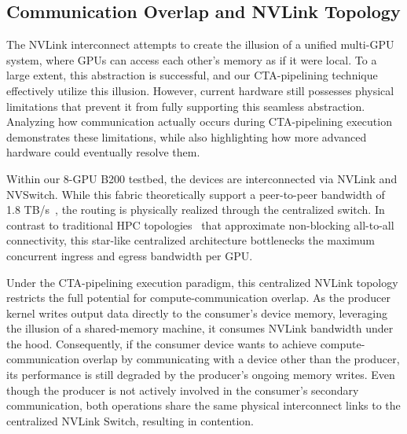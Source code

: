 

\subsection{Communication Overlap and NVLink Topology}

The NVLink interconnect attempts to create the illusion of a unified multi-GPU system, where GPUs can access each other's memory as if it were local. To a large extent, this abstraction is successful, and our CTA-pipelining technique effectively utilize this illusion. However, current hardware still possesses physical limitations that prevent it from fully supporting this seamless abstraction. Analyzing how communication actually occurs during CTA-pipelining execution demonstrates these limitations, while also highlighting how more advanced hardware could eventually resolve them.

Within our 8-GPU B200 testbed, the devices are interconnected via NVLink and NVSwitch. While this fabric theoretically support a peer-to-peer bandwidth of 1.8 TB/s~\cite{nvhgx}, the routing is physically realized through the centralized switch. In contrast to traditional HPC topologies~\cite{hpctopology} that approximate non-blocking all-to-all connectivity, this star-like centralized architecture bottlenecks the maximum concurrent ingress and egress bandwidth per GPU.

Under the CTA-pipelining execution paradigm, this centralized NVLink topology restricts the full potential for compute-communication overlap. As the producer kernel writes output data directly to the consumer's device memory, leveraging the illusion of a shared-memory machine, it consumes NVLink bandwidth under the hood. Consequently, if the consumer device wants to achieve compute-communication overlap by communicating with a device other than the producer, its performance is still degraded by the producer's ongoing memory writes. Even though the producer is not actively involved in the consumer's secondary communication, both operations share the same physical interconnect links to the centralized NVLink Switch, resulting in contention.

